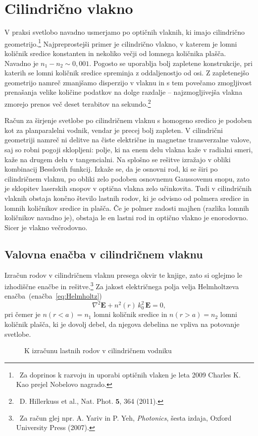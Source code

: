 \section{Cilindrično vlakno}
\label{chap:Cilinder}
V praksi svetlobo navadno usmerjamo po optičnih vlaknih, ki imajo cilindrično 
geometrijo.\footnote{~Za doprinos k razvoju in uporabi optičnih vlaken je leta 2009 Charles
K. Kao prejel Nobelovo nagrado.}
Najpreprostejši primer je cilindrično vlakno, v katerem je lomni količnik 
sredice konstanten in nekoliko večji od lomnega količnika plašča. Navadno je 
$n_1 - n_2 \sim 0,001$. Pogosto se uporablja
bolj zapletene konstrukcije, pri katerih se lomni količnik sredice spreminja z
oddaljenostjo od osi. Z zapletenejšo geometrijo namreč zmanjšamo disperzijo v vlaknu in s tem
povečamo zmogljivost prenašanja velike količine podatkov na dolge razdalje -- 
najzmogljivejša vlakna zmorejo prenos več deset terabitov na 
sekundo.\footnote{~D. Hillerkuss et al., Nat. Phot. $\mathbf{5}$, 364 (2011).}

Račun za širjenje svetlobe po cilindričnem vlaknu s homogeno sredico
je podoben kot za planparalelni vodnik, vendar je precej bolj
zapleten. V cilindrični geometriji namreč ni delitve na čiste električne in 
magnetne transverzalne valove, saj so robni pogoji sklopljeni: polje, ki na enem delu
vlakna kaže v radialni smeri, kaže na drugem delu v tangencialni. Na splošno se rešitve izražajo 
v obliki kombinacij Besslovih funkcij. Izkaže se, da je osnovni rod, ki se  širi po
cilindričnem vlaknu, po obliki zelo podoben osnovnemu Gaussovemu snopu, zato je sklopitev
laserskih snopov v optična vlakna zelo učinkovita. Tudi v cilindričnih vlaknih 
obstaja končno število lastnih rodov, ki je odvisno od polmera sredice in
lomnih količnikov sredice in plašča. Če je polmer zadosti majhen (razlika lomnih
količnikov navadno je), obstaja le en lastni rod in optično vlakno je 
enorodovno. Sicer je vlakno večrodovno.

\subsection*{Valovna enačba v cilindričnem vlaknu}
Izračun rodov v cilindričnem vlaknu presega okvir te knjige, zato
si oglejmo le izhodiščne enačbe in rešitve.\footnote{~Za račun glej npr. A. Yariv in 
P. Yeh, {\it Photonics}, šesta izdaja, Oxford
University Press (2007).} Za jakost električnega polja velja 
Helmholtzeva enačba~(enačba~\ref{eq:Helmholtz})
\begin{equation}
\nabla^2 \mathbf{E} + n^2(r)\, k_0^2\, \mathbf{E} = 0,
\end{equation}
pri čemer je $n(r<a)=n_1$ lomni količnik sredice in $n(r>a)=n_2$ 
lomni količnik plašča, ki je dovolj debel, da njegova debelina ne 
vpliva na potovanje svetlobe.
\begin{figure}[ht]
\centering
\def\svgwidth{60truemm} 

\caption{K izračunu lastnih rodov v cilindričnem vodniku}
\label{fig:cilindricnivodnik}
\end{figure}

